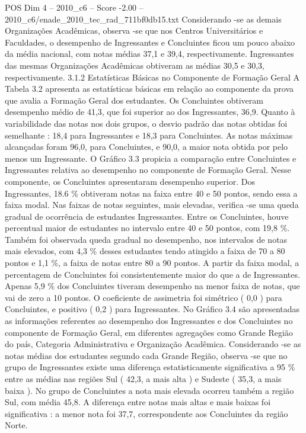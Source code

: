 \begin{textsample}{POS Dim 4 – 2010\_c6 – Score -2.00 – 2010\_c6/enade\_2010\_tec\_rad\_711bf0db15.txt}
Considerando -se as demais Organizações Acadêmicas, observa -se que nos Centros Universitários e Faculdades, o desempenho de Ingressantes e Concluintes ficou um pouco abaixo da média nacional, com notas médias 37,1 e 39,4, respectivamente.
Ingressantes das mesmas Organizações Acadêmicas obtiveram as médias 30,5 e 30,3, respectivamente. 3.1.2 Estatísticas Básicas no Componente de Formação Geral A Tabela 3.2 apresenta as estatísticas básicas em relação ao componente da prova que avalia a Formação Geral dos estudantes.
Os Concluintes obtiveram desempenho médio de 41,3, que foi superior ao dos Ingressantes, 36,9.
Quanto à variabilidade das notas nos dois grupos, o desvio padrão das notas obtidas foi semelhante : 18,4 para Ingressantes e 18,3 para Concluintes.
As notas máximas alcançadas foram 96,0, para Concluintes, e 90,0, a maior nota obtida por pelo menos um Ingressante.
O Gráfico 3.3 propicia a comparação entre Concluintes e Ingressantes relativa ao desempenho no componente de Formação Geral.
Nesse componente, os Concluintes apresentaram desempenho superior.
Dos Ingressantes, 18.6 \% obtiveram notas na faixa entre 40 e 50 pontos, sendo essa a faixa modal.
Nas faixas de notas seguintes, mais elevadas, verifica -se uma queda gradual de ocorrência de estudantes Ingressantes.
Entre os Concluintes, houve percentual maior de estudantes no intervalo entre 40 e 50 pontos, com 19,8 \%.
Também foi observada queda gradual no desempenho, nos intervalos de notas mais elevados, com 4,3 \% desses estudantes tendo atingido a faixa de 70 a 80 pontos e 1,1 \%, a faixa de notas entre 80 a 90 pontos.
A partir da faixa modal, a percentagem de Concluintes foi consistentemente maior do que a de Ingressantes.
Apenas 5,9 \% dos Concluintes tiveram desempenho na menor faixa de notas, que vai de zero a 10 pontos.
O coeficiente de assimetria foi simétrico ( 0,0 ) para Concluintes, e positivo ( 0,2 ) para Ingressantes.
No Gráfico 3.4 são apresentadas as informações referentes ao desempenho dos Ingressantes e dos Concluintes no componente de Formação Geral, em diferentes agregações como Grande Região do país, Categoria Administrativa e Organização Acadêmica.
Considerando -se as notas médias dos estudantes segundo cada Grande Região, observa -se que no grupo de Ingressantes existe uma diferença estatisticamente significativa a 95 \% entre as médias nas regiões Sul ( 42,3, a mais alta ) e Sudeste ( 35,3, a mais baixa ).
No grupo de Concluintes a nota mais elevada ocorreu também a região Sul, com média 45,8.
A diferença entre notas mais altas e mais baixas foi significativa : a menor nota foi 37,7, correspondente aos Concluintes da região Norte.

\end{textsample}
